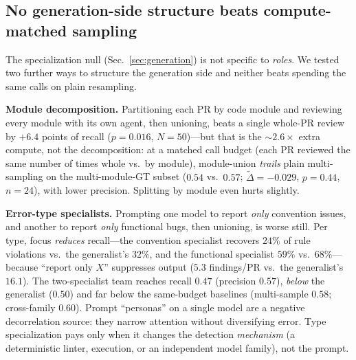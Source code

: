 %


\subsection{No generation-side structure beats compute-matched sampling}
\label{sec:decomp}
The specialization null (Sec.~\ref{sec:generation}) is not specific to
\emph{roles}. We tested two further ways to structure the generation side and
neither beats spending the same calls on plain resampling.

\textbf{Module decomposition.} Partitioning each PR by code module and
reviewing every module with its own agent, then unioning, beats a single
whole-PR review by ${+}6.4$ points of recall ($p{=}0.016$, $N{=}50$)---but that
is the ${\sim}2.6{\times}$ extra compute, not the decomposition: at a matched
call budget (each PR reviewed the same number of times whole vs.\ by module),
module-union \emph{trails} plain multi-sampling on the multi-module-GT subset
($0.54$ vs.\ $0.57$; $\tilde\Delta{=}{-}0.029$, $p{=}0.44$, $n{=}24$), with
lower precision. Splitting by module even hurts slightly.

\textbf{Error-type specialists.} Prompting one model to report \emph{only}
convention issues, and another to report \emph{only} functional bugs, then
unioning, is worse still. Per type, focus \emph{reduces} recall---the
convention specialist recovers $24\%$ of rule violations vs.\ the generalist's
$32\%$, and the functional specialist $59\%$ vs.\ $68\%$---because ``report only
$X$'' suppresses output ($5.3$ findings/PR vs.\ the generalist's $16.1$). The
two-specialist team reaches recall $0.47$ (precision $0.57$), \emph{below} the
generalist ($0.50$) and far below the same-budget baselines (multi-sample
$0.58$; cross-family $0.60$). Prompt ``personas'' on a single model are a
negative decorrelation source: they narrow attention without diversifying
error. Type specialization pays only when it changes the detection
\emph{mechanism} (a deterministic linter, execution, or an independent model
family), not the prompt.


